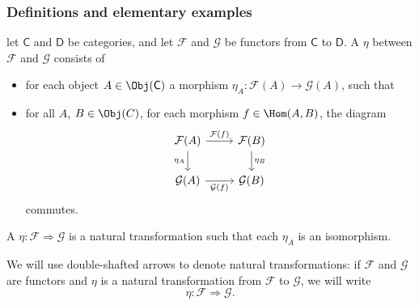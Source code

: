 \documentclass[notes.tex]{subfiles}
\begin{document}
\subsubsection{Definitions and elementary examples}

\begin{definition}
  \label{def:naturaltransformation}
  let $\mathsf{C}$ and $\mathsf{D}$ be categories, and let $\mathcal{F}$ and $\mathcal{G}$ be functors from $\mathsf{C}$ to $\mathsf{D}$. A  $\eta$ between $\mathcal{F}$ and $\mathcal{G}$ consists of
  \begin{itemize}
    \item for each object $A \in \Obj(\mathsf{C})$ a morphism $\eta_{A}\colon \mathcal{F}(A) \to \mathcal{G}(A)$, such that
    \item for all $A$, $B \in \Obj(C)$, for each morphism $f \in \Hom(A,B)$, the diagram
      \begin{equation*}
        \begin{tikzcd}
          \mathcal{F}(A)\arrow[d, swap, "\eta_{A}"] \arrow[r, "\mathcal{F}(f)"] & \mathcal{F}(B)\arrow[d, "\eta_{B}"] \\
          \mathcal{G}(A) \arrow[r, swap, "\mathcal{G}(f)"] & \mathcal{G}(B)
        \end{tikzcd}
      \end{equation*}
      commutes.
  \end{itemize}
\end{definition}

\begin{definition}
  \label{def:naturalisomorphism}
  A  $\eta\colon \mathcal{F} \Rightarrow \mathcal{G}$ is a natural transformation such that each $\eta_{A}$ is an isomorphism.
\end{definition}

\begin{notation}
  We will use double-shafted arrows to denote natural transformations: if $\mathcal{F}$ and $\mathcal{G}$ are functors and $\eta$ is a natural transformation from $\mathcal{F}$ to $\mathcal{G}$, we will write
  \begin{equation*}
    \eta\colon \mathcal{F} \Rightarrow \mathcal{G}.
  \end{equation*}
\end{notation}
\end{document}
